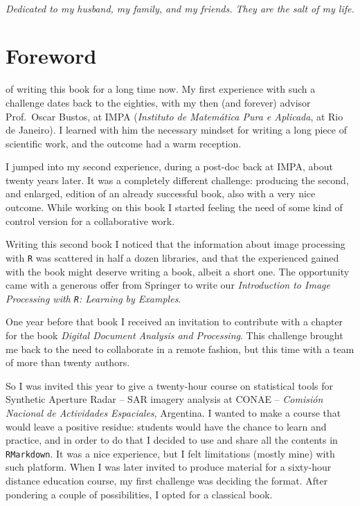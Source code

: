 \documentclass[a4paper]{tufte-book} %
\begin{document}

\cleardoublepage
~\vfill
\begin{doublespace}
\noindent\fontsize{18}{22}\selectfont\itshape
\nohyphenation
Dedicated to my husband, my family, and my friends. They are the salt of my life.
\end{doublespace}
\vfill
\vfill


\cleardoublepage
\chapter*{Foreword} %

 of writing this book for a long time now.
My first experience with such a challenge dates back to the eighties, with my then (and forever) advisor Prof.\ Oscar Bustos, at IMPA (\textit{Instituto de Matem\'atica Pura e Aplicada}, at Rio de Janeiro).
I learned with him the necessary mindset for writing a long piece of scientific work, and the outcome had a warm reception\cite{BustosFrery:92:ABE}.

I jumped into my second experience, during a post-doc back at IMPA, about twenty years later.
It was a completely different challenge: producing the second, and enlarged, edition of an already successful book, also with a very nice outcome\cite{IPVG:2008}.
While working on this book I started feeling the need of some kind of control version for a collaborative work.

Writing this second book I noticed that the information about image processing with \texttt R\cite{Rmanual} was scattered in half a dozen libraries, and that the experienced gained with the book might deserve writing a book, albeit a short one.
The opportunity came with a generous offer from Springer to write our \textit{Introduction to Image Processing with \texttt R: Learning by Examples}\cite{IntroImageProcessingR}.

One year before that book I received an invitation to contribute with a chapter for the book \textit{Digital Document Analysis and Processing}\cite{DigitalDocumentAnalysisProcessing}.
This challenge brought me back to the need to collaborate in a remote fashion, but this time with a team of more than twenty authors.

So I was invited this year to give a twenty-hour course on statistical tools for Synthetic Aperture Radar -- SAR imagery analysis at CONAE -- \textit{Comisi\'on Nacional de Actividades Espaciales}, Argentina.
I wanted to make a course that would leave a positive residue:
students would have the chance to learn and practice, and in order to do that I decided to use and share all the contents in \texttt{RMarkdown}.
It was a nice experience, but I felt limitations (mostly mine) with such platform.
When I was later invited to produce material for a sixty-hour distance education course, my first challenge was deciding the format.
After pondering a couple of possibilities, I opted for a classical book.
\end{document}
